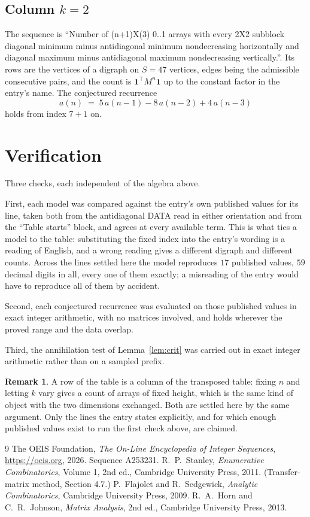 \documentclass[11pt,a4paper]{article}
\theoremstyle{plain}
\theoremstyle{definition}
\newtheorem{remark}[theorem]{Remark}
\begin{document}
\subsection*{Column $k$$=2$}
The sequence is ``Number of (n+1)X(3) 0..1 arrays with every 2X2 subblock diagonal minimum minus antidiagonal minimum nondecreasing horizontally and diagonal maximum minus antidiagonal maximum nondecreasing vertically.''. Its rows are the vertices of a digraph on
$S=47$ vertices, edges being the admissible consecutive pairs, and the count is
$\mathbf{1}^{\!\top}M^{n}\mathbf{1}$ up to the constant factor in the entry's name.
The conjectured recurrence
\[
a(n)\;=\;5\,a(n-1) - 8\,a(n-2) + 4\,a(n-3)
\]
holds from index $7+1$ on.

\section{Verification}

Three checks, each independent of the algebra above.

First, each model was compared against the entry's own published values for its line, taken
both from the antidiagonal DATA read in either orientation and from the ``Table starts''
block, and agrees at every available term. This is what ties a model to the table:
substituting the fixed index into the entry's wording is a reading of English, and a wrong
reading gives a different digraph and different counts. Across the lines settled here the
model reproduces $17$ published values, $59$ decimal digits in all, every one of
them exactly; a misreading of the entry would have to reproduce all of them by accident.

Second, each conjectured recurrence was evaluated on those published values in exact
integer arithmetic, with no matrices involved, and holds wherever the proved range and the
data overlap.

Third, the annihilation test of Lemma~\ref{lem:crit} was carried out in exact integer
arithmetic rather than on a sampled prefix.

\begin{remark}
A row of the table is a column of the transposed table: fixing $n$ and letting $k$ vary gives a
count of arrays of fixed height, which is the same kind of object with the two dimensions
exchanged. Both are settled here by the same argument. Only the lines the entry states
explicitly, and for which enough published values exist to run the first check above, are
claimed.
\end{remark}

\begin{thebibliography}{9}
 The OEIS Foundation, \emph{The On-Line Encyclopedia of Integer
Sequences}, \url{https://oeis.org}, 2026. Sequence A253231.
 R.~P.~Stanley, \emph{Enumerative Combinatorics}, Volume 1, 2nd ed.,
Cambridge University Press, 2011. (Transfer-matrix method, Section 4.7.)
 P.~Flajolet and R.~Sedgewick, \emph{Analytic Combinatorics}, Cambridge
University Press, 2009.
 R.~A.~Horn and C.~R.~Johnson, \emph{Matrix Analysis}, 2nd ed., Cambridge
University Press, 2013.
\end{thebibliography}
\end{document}
